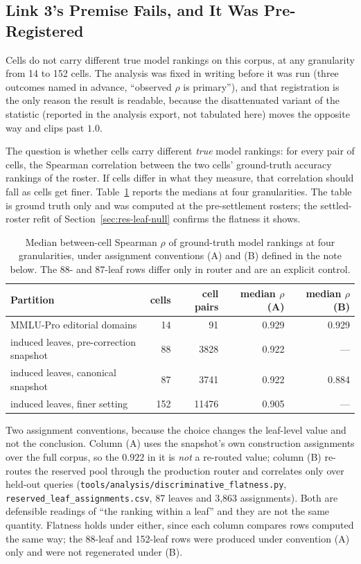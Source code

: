 \subsection{Link 3's Premise Fails, and It Was Pre-Registered}\label{sec:res-granularity}

Cells do not carry different true model rankings on
this corpus, at any granularity from 14 to 152 cells. The analysis was
fixed in writing before it was run (three outcomes named in advance,
``observed $\rho$ is primary''), and that
registration is the only reason the result is readable, because the
disattenuated variant of the statistic (reported in the analysis
export, not tabulated here) moves the opposite way and clips past
$1.0$.

The question is whether cells carry different \emph{true} model
rankings: for every pair of cells, the Spearman correlation between the
two cells' ground-truth accuracy rankings of the roster. If cells
differ in what they measure, that correlation should fall as cells get
finer. Table~\ref{tab:granularity} reports the medians at four
granularities. The table is ground truth only and was computed at the
pre-settlement rosters; the settled-roster refit of
Section~\ref{sec:res-leaf-null} confirms the flatness it shows.

\begin{table}[htbp]
\centering
\caption{Median between-cell Spearman $\rho$ of ground-truth model
rankings at four granularities, under assignment conventions (A) and
(B) defined in the note below. The 88- and 87-leaf rows differ only
in router and are an explicit control.}
\label{tab:granularity}
\begin{tabular}{lrrrr}
\toprule
Partition & cells & cell pairs & median $\rho$ (A) & median $\rho$ (B) \\
\midrule
MMLU-Pro editorial domains & 14 & 91 & 0.929 & 0.929 \\
induced leaves, pre-correction snapshot & 88 & 3828 & 0.922 & --- \\
induced leaves, canonical snapshot & 87 & 3741 & 0.922 & 0.884 \\
induced leaves, finer setting & 152 & 11476 & 0.905 & --- \\
\bottomrule
\end{tabular}
\par\smallskip
\footnotesize Two assignment conventions, because the choice changes
the leaf-level value and not the conclusion. Column (A) uses the
snapshot's own construction assignments over the full corpus, so the
$0.922$ in it is \emph{not} a re-routed value; column
(B) re-routes the reserved pool through the production router and
correlates only over held-out queries
(\texttt{tools/analysis/discriminative\_flatness.py},
\texttt{reserved\_leaf\_assignments.csv}, 87 leaves and 3{,}863
assignments). Both are defensible readings of ``the ranking within a
leaf'' and they are not the same quantity. Flatness holds under either,
since each column compares rows computed the same way; the 88-leaf and
152-leaf rows were produced under convention (A) only and were not
regenerated under (B).
\end{table}

